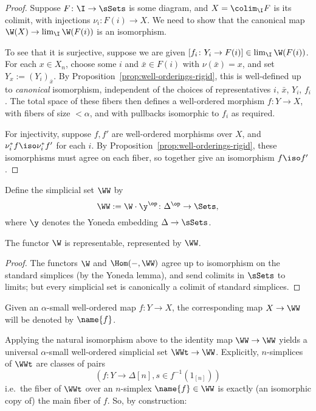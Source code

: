 \begin{proof}
Suppose $F \colon \I \to \sSets$ is some diagram, and $X = \colim_\I F$ is its colimit, with injections $\nu_i \colon F(i) \to X$.  We need to show that the canonical map $\W(X) \to \lim_\I \W(F(i))$ is an isomorphism.

To see that it is surjective, suppose we are given $[f_i \colon Y_i \to F(i)] \in \lim_\I \W(F(i))$.  For each $x \in X_n$, choose some $i$ and $\bar{x} \in F(i)$ with $\nu(\bar{x}) = x$, and set $Y_x := (Y_i)_{\bar{x}}$.  By Proposition~\ref{prop:well-orderings-rigid}, this is well-defined up to \emph{canonical} isomorphism, independent of the choices of representatives $i$, $\bar{x}$, $Y_i$, $f_i$.  The total space of these fibers then defines a well-ordered morphism $f \colon Y \to X$, with fibers of size $<\alpha$, and with pullbacks isomorphic to $f_i$ as required.

For injectivity, suppose $f, f'$ are well-ordered morphisms over $X$, and $\nu_i^* f \iso \nu_i^* f'$ for each $i$.  By Proposition~\ref{prop:well-orderings-rigid}, these isomorphisms must agree on each fiber, so together give an isomorphism $f \iso f'$.
\end{proof}

Define the simplicial set $\WW$ by
\[\WW := \W \cdot \y^{\op} \colon \Delta^{\op} \to \Sets,\]
where $\y$ denotes the Yoneda embedding $\Delta \to \sSets$.

\begin{lemma} \label{lemma:w-representable}
The functor $\W$ is representable, represented by $\WW$.
\end{lemma}

\begin{proof}
The functors $\W$ and $\Hom(-,\WW)$ agree up to isomorphism on the standard simplices (by the Yoneda lemma), and send colimits in $\sSets$ to limits; but every simplicial set is canonically a colimit of standard simplices.
\end{proof}

\begin{notation}
Given an $\alpha$-small well-ordered map $f \colon Y \to X$, the corresponding map $X \to \WW$ will be denoted by $\name{f}$.
\end{notation}

Applying the natural isomorphism above to the identity map $\WW \to \WW$ yields a universal $\alpha$-small well-ordered simplicial set $\WWt \to \WW$.  Explicitly, $n$-simplices of $\WWt$ are classes of pairs
\[(f \colon Y \to \Delta [n], s \in f^{-1}(1_{[n]}))\]
i.e.\ the fiber of $\WWt$ over an $n$-simplex $\name{f} \in \WW$ is exactly (an isomorphic copy of) the main fiber of $f$.  So, by construction:

